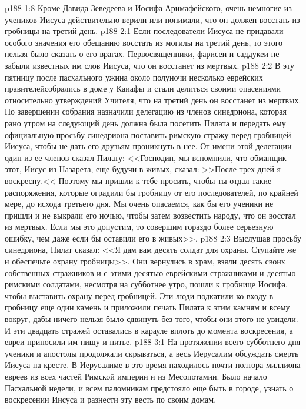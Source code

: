 \vs p188 1:8 Кроме Давида Зеведеева и Иосифа Аримафейского, очень немногие из учеников Иисуса действительно верили или понимали, что он должен восстать из гробницы на третий день.
\vs p188 2:1 Если последователи Иисуса не придавали особого значения его обещанию восстать из могилы на третий день, то этого нельзя было сказать о его врагах. Первосвященники, фарисеи и саддукеи не забыли известных им слов Иисуса, что он восстанет из мертвых.
\vs p188 2:2 В эту пятницу после пасхального ужина около полуночи несколько еврейских правителейсобрались в доме у Каиафы и стали делиться своими опасениями относительно утверждений Учителя, что на третий день он восстанет из мертвых. По завершении собрания назначили делегацию из членов синедриона, которая рано утром на следующий день должна была посетить Пилата и передать ему официальную просьбу синедриона поставить римскую стражу перед гробницей Иисуса, чтобы не дать его друзьям проникнуть в нее. От имени этой делегации один из ее членов сказал Пилату: <<Господин, мы вспомнили, что обманщик этот, Иисус из Назарета, еще будучи в живых, сказал: >>После трех дней я воскресну.<< Поэтому мы пришли к тебе просить, чтобы ты отдал такие распоряжения, которые оградили бы гробницу от его последователей, по крайней мере, до исхода третьего дня. Мы очень опасаемся, как бы его ученики не пришли и не выкрали его ночью, чтобы затем возвестить народу, что он восстал из мертвых. Если мы это допустим, то совершим гораздо более серьезную ошибку, чем даже если бы оставили его в живых>>.
\vs p188 2:3 Выслушав просьбу синедриона, Пилат сказал: <<Я дам вам десять солдат для охраны. Ступайте же и обеспечьте охрану гробницы>>. Они вернулись в храм, взяли десять своих собственных стражников и с этими десятью еврейскими стражниками и десятью римскими солдатами, несмотря на субботнее утро, пошли к гробнице Иосифа, чтобы выставить охрану перед гробницей. Эти люди подкатили ко входу в гробницу еще один камень и приложили печать Пилата к этим камням и всему вокруг, дабы ничего нельзя было сдвинуть без того, чтобы они этого не увидели. И эти двадцать стражей оставались в карауле вплоть до момента воскресения, а евреи приносили им пищу и питье.
\vs p188 3:1 На протяжении всего субботнего дня ученики и апостолы продолжали скрываться, а весь Иерусалим обсуждать смерть Иисуса на кресте. В Иерусалиме в это время находилось почти полтора миллиона евреев из всех частей Римской империи и из Месопотамии. Было начало Пасхальной недели, и всем паломникам предстояло еще быть в городе, узнать о воскресении Иисуса и разнести эту весть по своим домам.

